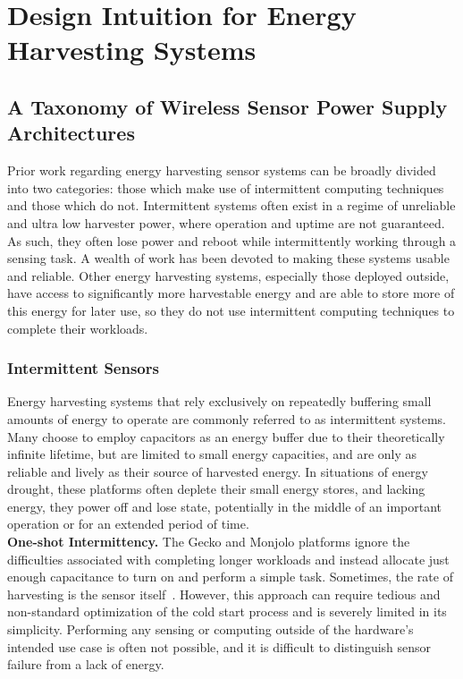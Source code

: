 \chapter{Design Intuition for Energy Harvesting Systems}
\label{chap:intuition}

\section{A Taxonomy of Wireless Sensor Power Supply Architectures}
\label{sec:intuition_related}

Prior work regarding energy harvesting sensor systems can be broadly
divided into two categories: those which make use of intermittent computing
techniques and those which do not.
Intermittent systems often exist in a regime of unreliable and ultra low harvester power, where
operation and uptime are not guaranteed. As such, they often lose power and
reboot while intermittently working through a sensing task.
A wealth of work has been devoted to
making these systems usable and reliable.
Other energy harvesting systems, especially those deployed outside, have access
to significantly more harvestable energy and are able to store more of this energy
for later use, so they
do not use intermittent computing techniques to complete their workloads.
\subsection{Intermittent Sensors}
\label{sec:related:intermittent}

Energy harvesting systems that rely
exclusively on repeatedly buffering small amounts of energy to
operate are commonly referred to as intermittent systems.
Many choose to employ
capacitors as an energy buffer due to their theoretically infinite lifetime,
but are limited to small energy capacities, and are only as reliable and
lively as their source of harvested energy.
In situations of energy drought, 
these platforms often deplete their 
small energy stores, and lacking energy,
they power off and lose
state, potentially in the middle of an important operation or for an extended
period of time.
\\

\vspace{-6pt}
\noindent
\textbf{One-shot Intermittency.}
The Gecko and Monjolo platforms ignore the difficulties associated with
completing longer workloads and instead allocate
just enough capacitance to turn on and perform a simple task. Sometimes, the
rate of harvesting is the sensor itself~\cite{campbellEnergy14,
yervaGrafting12, debruin2013monjolo}.  However, this approach can require
tedious and non-standard optimization of the cold start process and is severely
limited in its simplicity. Performing any sensing or computing outside of the
hardware's intended use case is often not possible,
and it is difficult to distinguish sensor failure from a lack of energy.
\\


